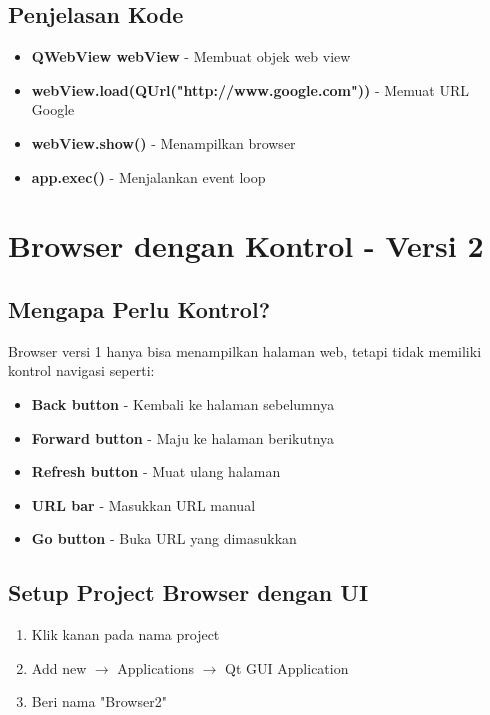 \subsection{Penjelasan Kode}

\begin{itemize}
\item \textbf{QWebView webView} - Membuat objek web view
\item \textbf{webView.load(QUrl("http://www.google.com"))} - Memuat URL Google
\item \textbf{webView.show()} - Menampilkan browser
\item \textbf{app.exec()} - Menjalankan event loop
\end{itemize}

\section{Browser dengan Kontrol - Versi 2}

\subsection{Mengapa Perlu Kontrol?}

Browser versi 1 hanya bisa menampilkan halaman web, tetapi tidak memiliki kontrol navigasi seperti:
\begin{itemize}
\item \textbf{Back button} - Kembali ke halaman sebelumnya
\item \textbf{Forward button} - Maju ke halaman berikutnya
\item \textbf{Refresh button} - Muat ulang halaman
\item \textbf{URL bar} - Masukkan URL manual
\item \textbf{Go button} - Buka URL yang dimasukkan
\end{itemize}

\subsection{Setup Project Browser dengan UI}

\begin{enumerate}
\item Klik kanan pada nama project
\item Add new $\rightarrow$ Applications $\rightarrow$ Qt GUI Application
\item Beri nama "Browser2"
\end{enumerate}

